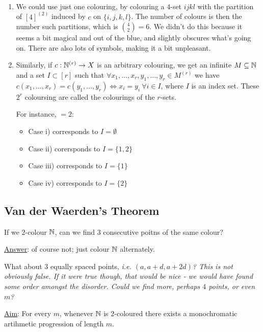 \documentclass[10pt]{article}
\begin{document}
\begin{remark*}[Remarks]\ 
    \begin{enumerate}
        \item We could use just one colouring, by colouring a $4$-set $ijkl$ with the partition of $[4]^{(2)}$ induced by $c$ on $\{i,j,k,l\}$. The number of colours is then the number such partitions, which is ${4\choose 2} = 6$. We didn't do this because it seems a bit magical and out of the blue, and slightly obscures what's going on. There are also lots of symbols, making it a bit unpleasant.
        
        \item Similarly, if $c:\mathbb{N}^{(r)}\rightarrow X$ is an arbitrary colouring, we get an infinite $M\subseteq \mathbb{N}$ and a set $I\subset [r]$ such that $\forall x_1,\dots,x_r,y_1,\dots,y_r\in M^{(r)}$ we have $c(x_1,\dots,x_r) = c(y_1,\dots,y_r) \iff x_i=y_i\ \forall i\in I$, where $I$ is an index set. These $2^r$ coloursing are called the  colourings of the $r$-sets.
        
        For instance, $ = 2$:
        \begin{itemize}
            \item Case i) corresponds to $I = \emptyset$
            \item Case ii) corersponds to $I = \{1,2\}$
            \item Case iii) corresponds to $I = \{1\}$
            \item Case iv) corresponds to $I = \{2\}$
        \end{itemize}
    \end{enumerate}    
\end{remark*}

\subsection{Van der Waerden's Theorem}

If we $2$-colour $\mathbb{N}$, can we find $3$ consecutive poitns of the same colour?

\underline{Answer}: of course not; just colour $\mathbb{N}$ alternately.

What about $3$ equally spaced points, \it{i.e.} $(a,a+d,a+2d)$? This is not obviously false. If it were true though, that would be nice - we would have found some order amongst the disorder. Could we find more, perhaps $4$ points, or even $m$?

\underline{Aim}: For every $m$, whenever $\mathbb{N}$ is $2$-coloured there exists a monochromatic artihmetic progression of length $m$.
\end{document}
